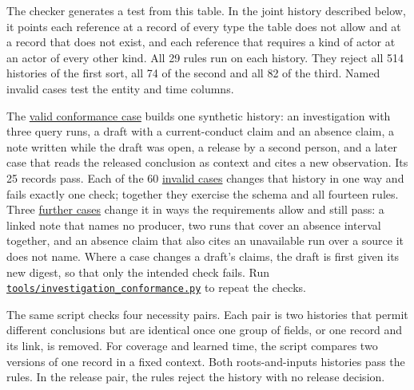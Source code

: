 \documentclass[
  11pt,
]{article}
\begin{document}
\endgroup

The checker generates a test from this table. In the joint history
described below, it points each reference at a record of every type the
table does not allow and at a record that does not exist, and each
reference that requires a kind of actor at an actor of every other kind.
All 29 rules run on each history. They reject all 514 histories of the
first sort, all 74 of the second and all 82 of the third. Named invalid
cases test the entity and time columns.

The
\href{SUPPLEMENT/S4_INVESTIGATION_RECORDS/conformance_valid.json}{valid
conformance case} builds one synthetic history: an investigation with
three query runs, a draft with a current-conduct claim and an absence
claim, a note written while the draft was open, a release by a second
person, and a later case that reads the released conclusion as context
and cites a new observation. Its 25 records pass. Each of the 60
\href{SUPPLEMENT/S4_INVESTIGATION_RECORDS/conformance_invalid.json}{invalid
cases} changes that history in one way and fails exactly one check;
together they exercise the schema and all fourteen rules. Three
\href{SUPPLEMENT/S4_INVESTIGATION_RECORDS/conformance_accept.json}{further
cases} change it in ways the requirements allow and still pass: a linked
note that names no producer, two runs that cover an absence interval
together, and an absence claim that also cites an unavailable run over a
source it does not name. Where a case changes a draft's claims, the
draft is first given its new digest, so that only the intended check
fails. Run
\href{tools/investigation_conformance.py}{\texttt{tools/\allowbreak investigation\_conformance.py}}
to repeat the checks.

The same script checks four necessity pairs. Each pair is two histories
that permit different conclusions but are identical once one group of
fields, or one record and its link, is removed. For coverage and learned
time, the script compares two versions of one record in a fixed context.
Both roots-and-inputs histories pass the rules. In the release pair, the
rules reject the history with no release decision.

\begingroup\small
\end{document}
